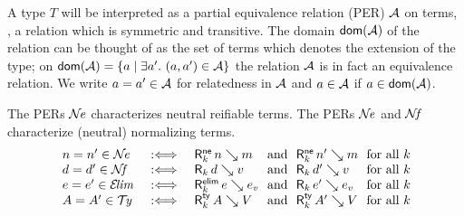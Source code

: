 \documentclass[acmlarge,review,anonymous]{acmart}\settopmatter{printfolios=true}
\begin{document}
A type $T$ will be interpreted as a partial equivalence relation (PER) $\mathcal{A}$ on terms, \ie, a relation which is symmetric and transitive. The domain $\mathop{\mathsf{dom}}\nolimits(\mathcal{A})$ of the relation can be thought of as the set of terms which denotes the extension of the type; on $\mathop{\mathsf{dom}}\nolimits(\mathcal{A}) = \{a \mid \exists a'.\ (a,a') \in \mathcal{A} \}$ the relation $\mathcal{A}$ is in fact an equivalence relation.  We write $a = a' \in \mathcal{A}$ for relatedness in $\mathcal{A}$ and $a \in \mathcal{A}$ if $a \in \mathop{\mathsf{dom}}\nolimits(\mathcal{A})$.

The PERs $\mathcal{N}\!\mathit{e}$ characterizes neutral reifiable terms.
The PERs $\mathcal{N}\!\mathit{e}$ and $\mathcal{N}\!\mathit{f}$ characterize (neutral) normalizing terms.
\[
\begin{array}{l@{\quad}l@{\quad}l@{~}l@{~}l@{~}l@{~}l@{~}l}
  n = n' \in \NE
    & \defas &
    \RNe k n m &\mand& \RNe k {n'} {m} &\mforall k \\
  d = d' \in \NF
    & \defas &
    \R k d v &\mand& \R k {d'} {v} &\mforall k \\
  e = e' \in \ELIM
    & \defas &
    \RElim k e e_v &\mand& \R k {e'} {e_v} &\mforall k \\
  A = A' \in \TY
    & \defas &
    \RTy k A V &\mand& \RTy k {A'} {V} &\mforall k \\
\end{array}
\]
\end{document}
